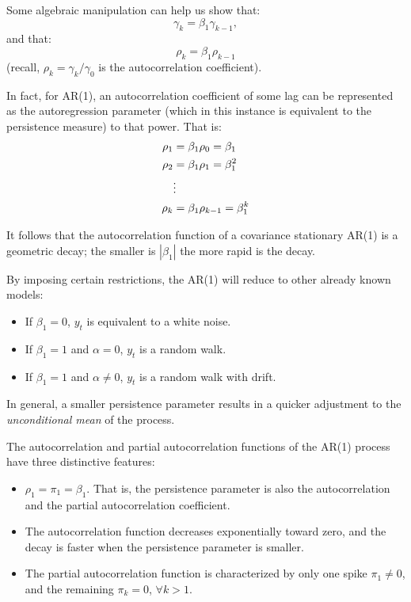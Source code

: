 \documentclass[
  oneside]{book}
\providecommand{\tightlist}{%
  \setlength{\itemsep}{0pt}\setlength{\parskip}{0pt}}
\begin{document}
Some algebraic manipulation can help us show that: \[\gamma_k = \beta_1\gamma_{k-1},\] and that: \[\rho_{k} = \beta_1\rho_{k-1}\] (recall, \(\rho_k = \gamma_k/\gamma_0\) is the autocorrelation coefficient).

In fact, for AR(1), an autocorrelation coefficient of some lag can be represented as the autoregression parameter (which in this instance is equivalent to the persistence measure) to that power. That is:
\[
\begin{aligned}
\rho_1 &= \beta_1\rho_0 = \beta_1 \notag \\
\rho_2 &= \beta_1\rho_1 = \beta_1^2 \notag \\
&\vdots \notag \\
\rho_k &= \beta_1\rho_{k-1} = \beta_1^k
\end{aligned}
\]

It follows that the autocorrelation function of a covariance stationary AR(1) is a geometric decay; the smaller is \(|\beta_1|\) the more rapid is the decay.

By imposing certain restrictions, the AR(1) will reduce to other already known models:

\begin{itemize}
\tightlist
\item
  If \(\beta_1 = 0\), \(y_t\) is equivalent to a white noise.
\item
  If \(\beta_1 = 1\) and \(\alpha = 0\), \(y_t\) is a random walk.
\item
  If \(\beta_1 = 1\) and \(\alpha \neq 0\), \(y_t\) is a random walk with drift.
\end{itemize}

In general, a smaller persistence parameter results in a quicker adjustment to the \emph{unconditional mean} of the process.

The autocorrelation and partial autocorrelation functions of the AR(1) process have three distinctive features:

\begin{itemize}
\tightlist
\item
  \(\rho_1 = \pi_1 = \beta_1\). That is, the persistence parameter is also the autocorrelation and the partial autocorrelation coefficient.
\item
  The autocorrelation function decreases exponentially toward zero, and the decay is faster when the persistence parameter is smaller.
\item
  The partial autocorrelation function is characterized by only one spike \(\pi_1 \neq 0\), and the remaining \(\pi_k = 0\), \(\forall k > 1\).
\end{itemize}
\end{document}
